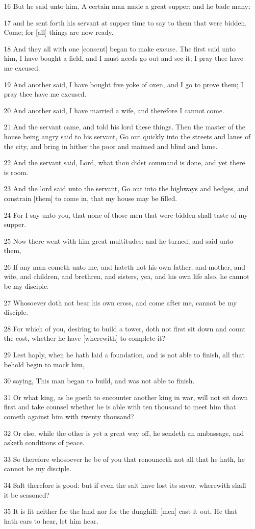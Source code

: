 \par 16 But he said unto him, A certain man made a great supper; and he bade many:
\par 17 and he sent forth his servant at supper time to say to them that were bidden, Come; for [all] things are now ready.
\par 18 And they all with one [consent] began to make excuse. The first said unto him, I have bought a field, and I must needs go out and see it; I pray thee have me excused.
\par 19 And another said, I have bought five yoke of oxen, and I go to prove them; I pray thee have me excused.
\par 20 And another said, I have married a wife, and therefore I cannot come.
\par 21 And the servant came, and told his lord these things. Then the master of the house being angry said to his servant, Go out quickly into the streets and lanes of the city, and bring in hither the poor and maimed and blind and lame.
\par 22 And the servant said, Lord, what thou didst command is done, and yet there is room.
\par 23 And the lord said unto the servant, Go out into the highways and hedges, and constrain [them] to come in, that my house may be filled.
\par 24 For I say unto you, that none of those men that were bidden shall taste of my supper.
\par 25 Now there went with him great multitudes: and he turned, and said unto them,
\par 26 If any man cometh unto me, and hateth not his own father, and mother, and wife, and children, and brethren, and sisters, yea, and his own life also, he cannot be my disciple.
\par 27 Whosoever doth not bear his own cross, and come after me, cannot be my disciple.
\par 28 For which of you, desiring to build a tower, doth not first sit down and count the cost, whether he have [wherewith] to complete it?
\par 29 Lest haply, when he hath laid a foundation, and is not able to finish, all that behold begin to mock him,
\par 30 saying, This man began to build, and was not able to finish.
\par 31 Or what king, as he goeth to encounter another king in war, will not sit down first and take counsel whether he is able with ten thousand to meet him that cometh against him with twenty thousand?
\par 32 Or else, while the other is yet a great way off, he sendeth an ambassage, and asketh conditions of peace.
\par 33 So therefore whosoever he be of you that renounceth not all that he hath, he cannot be my disciple.
\par 34 Salt therefore is good: but if even the salt have lost its savor, wherewith shall it be seasoned?
\par 35 It is fit neither for the land nor for the dunghill: [men] cast it out. He that hath ears to hear, let him hear.

